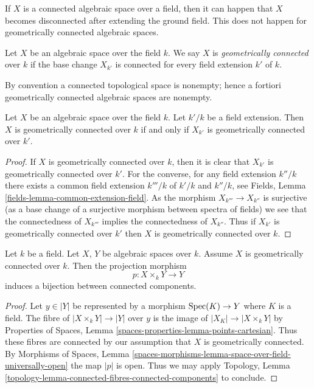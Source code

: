 \noindent
If $X$ is a connected algebraic space over a field, then it can happen that
$X$ becomes disconnected after extending the ground field. This does not
happen for geometrically connected algebraic spaces.

\begin{definition}
\label{definition-geometrically-connected}
Let $X$ be an algebraic space over the field $k$. We say $X$ is
{\it geometrically connected} over $k$ if the base change $X_{k'}$
is connected for every field extension $k'$ of $k$.
\end{definition}

\noindent
By convention a connected topological space is nonempty; hence a fortiori
geometrically connected algebraic spaces are nonempty.

\begin{lemma}
\label{lemma-geometrically-connected-check-after-extension}
Let $X$ be an algebraic space over the field $k$.
Let $k'/k$ be a field extension.
Then $X$ is geometrically connected over $k$ if and only if
$X_{k'}$ is geometrically connected over $k'$.
\end{lemma}

\begin{proof}
If $X$ is geometrically connected over $k$, then it is clear that
$X_{k'}$ is geometrically connected over $k'$. For the converse,
for any field extension $k''/k$ there exists a common
field extension $k'''/k$ of $k'/k$ and $k''/k$, see
Fields, Lemma \ref{fields-lemma-common-extension-field}. As the
morphism $X_{k'''} \to X_{k''}$ is surjective (as a base change of
a surjective morphism between spectra of fields) we see that the
connectedness of $X_{k'''}$ implies the connectedness of $X_{k''}$.
Thus if $X_{k'}$ is geometrically connected over $k'$ then
$X$ is geometrically connected over $k$.
\end{proof}

\begin{lemma}
\label{lemma-bijection-connected-components}
Let $k$ be a field. Let $X$, $Y$ be algebraic spaces over $k$.
Assume $X$ is geometrically connected over $k$.
Then the projection morphism
$$
p : X \times_k Y \longrightarrow Y
$$
induces a bijection between connected components.
\end{lemma}

\begin{proof}
Let $y \in |Y|$ be represented by a morphism $\mathop{\mathrm{Spec}}(K) \to Y$
where $K$ is a field. The fibre of $|X \times_k Y| \to |Y|$ over $y$
is the image of $|X_K| \to |X \times_k Y|$ by
Properties of Spaces, Lemma \ref{spaces-properties-lemma-points-cartesian}.
Thus these fibres are connected by our assumption that $X$ is
geometrically connected. By
Morphisms of Spaces, Lemma
\ref{spaces-morphisms-lemma-space-over-field-universally-open}
the map $|p|$ is open.
Thus we may apply Topology,
Lemma \ref{topology-lemma-connected-fibres-connected-components}
to conclude.
\end{proof}

